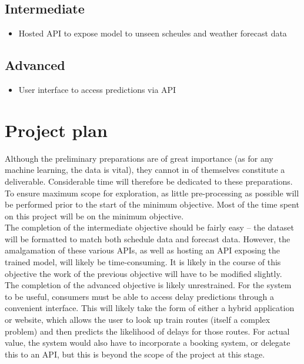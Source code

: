 \documentclass[11pt]{article} %
\begin{document}
\subsection*{Intermediate}

\begin{itemize}

	\item{Hosted API to expose model to unseen scheules and weather forecast data}

\end{itemize}

\subsection*{Advanced}

\begin{itemize}

	\item{User interface to access predictions via API}

\end{itemize}

\section*{Project plan}

Although the preliminary preparations are of great importance (as for any machine learning, the data is vital), they cannot in of themselves constitute a deliverable. Considerable time will therefore be dedicated to these preparations. To ensure maximum scope for exploration, as little pre-processing as possible will be performed prior to the start of the minimum objective. 
Most of the time spent on this project will be on the minimum objective. \\

The completion of the intermediate objective should be fairly easy – the dataset will be formatted to match both schedule data and forecast data. However, the amalgamation of these various APIs, as well as hosting an API exposing the trained model, will likely be time-consuming. It is likely in the course of this objective the work of the previous objective will have to be modified slightly. \\

The completion of the advanced objective is likely unrestrained. For the system to be useful, consumers must be able to access delay predictions through a convenient interface. This will likely take the form of either a hybrid application or website, which allows the user to look up train routes (itself a complex problem) and then predicts the likelihood of delays for those routes. For actual value, the system would also have to incorporate a booking system, or delegate this to an API, but this is beyond the scope of the project at this stage. 
\end{document}
